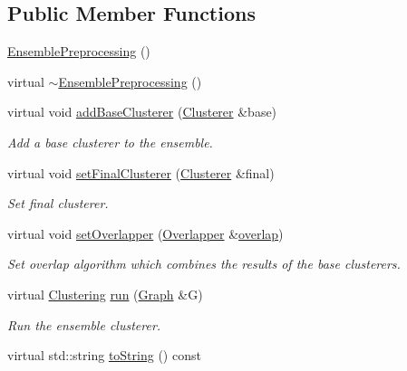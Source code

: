 \subsection*{Public Member Functions}
\begin{DoxyCompactItemize}
\item 
\hyperlink{class_networ_kit_1_1_ensemble_preprocessing_ab8a852b163be3ab8dc5dcf9270a23131}{Ensemble\-Preprocessing} ()
\item 
virtual \hyperlink{class_networ_kit_1_1_ensemble_preprocessing_a78ea80597bd19d84d7a23c4bc623a002}{$\sim$\-Ensemble\-Preprocessing} ()
\item 
virtual void \hyperlink{class_networ_kit_1_1_ensemble_preprocessing_a1c8de8dd50a3fc55f87ef5c133e6b93e}{add\-Base\-Clusterer} (\hyperlink{class_networ_kit_1_1_clusterer}{Clusterer} \&base)
\begin{DoxyCompactList}\small\item\em Add a base clusterer to the ensemble. \end{DoxyCompactList}\item 
virtual void \hyperlink{class_networ_kit_1_1_ensemble_preprocessing_a2e420ecb90d0c5886a18a4809e7fcad5}{set\-Final\-Clusterer} (\hyperlink{class_networ_kit_1_1_clusterer}{Clusterer} \&final)
\begin{DoxyCompactList}\small\item\em Set final clusterer. \end{DoxyCompactList}\item 
virtual void \hyperlink{class_networ_kit_1_1_ensemble_preprocessing_ac186607085f348789d82c29d2007266e}{set\-Overlapper} (\hyperlink{class_networ_kit_1_1_overlapper}{Overlapper} \&\hyperlink{class_networ_kit_1_1_ensemble_preprocessing_a2bf7860c6673aa0f0bafbe95fb7d2a87}{overlap})
\begin{DoxyCompactList}\small\item\em Set overlap algorithm which combines the results of the base clusterers. \end{DoxyCompactList}\item 
virtual \hyperlink{class_networ_kit_1_1_clustering}{Clustering} \hyperlink{class_networ_kit_1_1_ensemble_preprocessing_a5b561bde3aaeebfdddcba4e961d3f18e}{run} (\hyperlink{class_networ_kit_1_1_graph}{Graph} \&G)
\begin{DoxyCompactList}\small\item\em Run the ensemble clusterer. \end{DoxyCompactList}\item 
virtual std\-::string \hyperlink{class_networ_kit_1_1_ensemble_preprocessing_a2dd70cbd38c3562988fcf75e556e6aa2}{to\-String} () const 
\end{DoxyCompactItemize}

